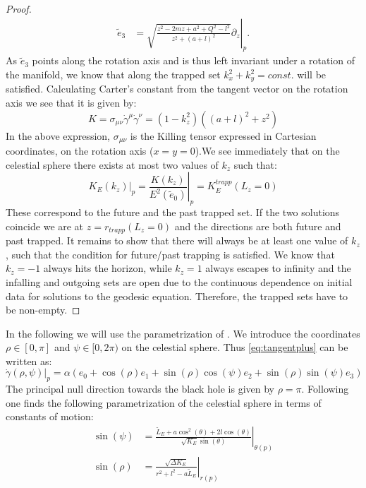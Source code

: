 \documentclass[reqno]{amsart}
\numberwithin{equation}{section}
\theoremstyle{plain}
\theoremstyle{definition}
\begin{document}
\begin{proof}
\begin{align}
\tilde e_3&=\left. \sqrt{\frac{z^2-2m z +a^2 + Q^2-l^2}{z^2+(a+l)^2}}\partial_z \right|_p. 
\end{align}
As $\tilde e_3$ points along the rotation axis and is thus left invariant under a rotation of the manifold, we know that along the trapped set $k_x^2+k_y^2=const.$ will be satisfied. Calculating Carter's constant from the tangent vector on the rotation axis we see that it is given by:
\begin{equation}
K = \sigma_{\mu \nu}   \dot \gamma^\mu \dot \gamma^\nu = (1-k_z^2) ((a+l)^2 + z^2)
\end{equation}
In the above expression, $\sigma_{\mu \nu}$ is the Killing tensor expressed in Cartesian coordinates, on the rotation axis ($x=y=0$).We see immediately that on the celestial sphere there exists at most two values of $k_z$ such that:
\begin{equation}
\left. K_E(k_z) \right|_p=\left. \frac{K(k_z)}{E^2(\tilde e_0)}\right|_p=K_E^{trapp}(L_z=0)
\end{equation}
These correspond to the future and the past trapped set. If the two solutions coincide we are at $z=r_{trapp}(L_z=0)$ and the directions are both future and past trapped. It remains to show that there will always be at least one value of $k_z$, such that the condition for future/past trapping is satisfied. We know that $k_z=-1$ always hits the horizon, while $k_z=1$ always escapes to infinity and the infalling and outgoing sets are open due to the continuous dependence on initial data for solutions to the geodesic equation. Therefore, the trapped sets have to be non-empty.
\end{proof}
In the following we will use the parametrization of \cite{grenzebach_photon_2014}. We introduce the coordinates $\rho \in[0,\pi]$ and $\psi \in[0,2\pi)$ on the celestial sphere. Thus \eqref{eq:tangentplus} can be written as:
\begin{equation}\label{eq:tangentsph}
\dot\gamma( \rho,\psi)|_p =\alpha ( e_0+ \cos(\rho) e_1+ \sin(\rho) \cos(\psi) e_2+ \sin(\rho)\sin(\psi) e_3)
\end{equation}
The principal null direction towards the black hole is given by $\rho=\pi$. Following \cite{grenzebach_photon_2014}  one finds the following parametrization of the celestial sphere in terms of constants of motion:
\begin{subequations}\label{eq:comonsphere}
\begin{align}
\sin(\psi)&= \left.\frac{\tilde L_E +a \cos^2 (\theta)+2l\cos(\theta)}{\sqrt{K_E}\sin(\theta)}\right|_{\theta(p)}\\
\sin(\rho)&= \left. \frac{\sqrt{\Delta K_E}}{r^2 +l^2 - a\tilde L_E}\right|_{r(p)}
\end{align}
\end{subequations}
\end{document}
